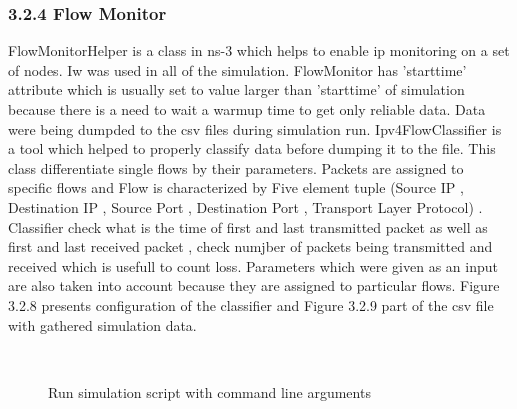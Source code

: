 \subsubsection{\hspace*{0.5cm}3.2.4 Flow Monitor}
\textnormal{\hspace{0.5cm}FlowMonitorHelper is a class in ns-3 which helps to enable ip monitoring on a set of nodes. Iw was used in all of the simulation. FlowMonitor has 'starttime' attribute which is usually set to value larger than 'starttime' of simulation because there is a need to wait a warmup time to get only reliable data. Data were being  dumpded to the csv files during simulation run. Ipv4FlowClassifier is a tool which helped to properly classify data before dumping it to the file. This class differentiate single flows by their parameters. Packets are assigned to specific flows and Flow is characterized by Five element tuple (Source IP , Destination IP , Source Port , Destination Port , Transport Layer Protocol) . Classifier check what is the time of first and last transmitted packet as well as first and last received packet , check numjber of packets being transmitted and received which is usefull to count loss. Parameters which were given as an input are also taken into account because they are assigned to particular flows. Figure 3.2.8 presents configuration of the classifier and Figure 3.2.9 part of the csv file with gathered simulation data. }
\begin{center}
	\begin{figure}[h]
		\centering
		\\
		\caption{Run simulation script with command line arguments}
	\end{figure}
\end{center}
